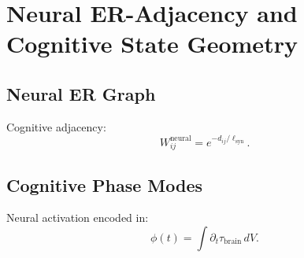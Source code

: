 \chapter{Neural ER-Adjacency and Cognitive State Geometry}

\section{Neural ER Graph}
Cognitive adjacency:
\[
W_{ij}^{\mathrm{neural}} = e^{-d_{ij}/\ell_{\mathrm{syn}}}.
\]

\section{Cognitive Phase Modes}
Neural activation encoded in:
\[
\phi(t) = \int \partial_t\tau_{\mathrm{brain}}\, dV.
\]

